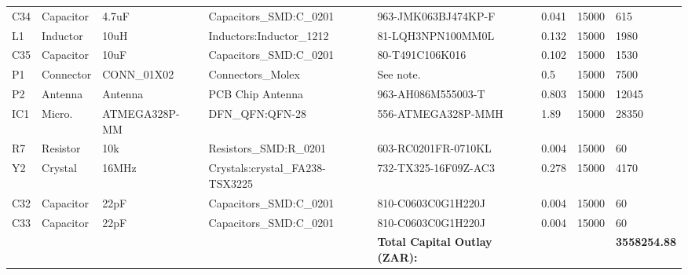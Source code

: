 \begin{landscape}
\begin{table}[]
\begin{tabular}{llllllll}
C34            & Capacitor     & 4.7uF                      & Capacitors\_SMD:C\_0201         & 963-JMK063BJ474KP-F                  & 0.041                & 15000           & 615                  \\
L1             & Inductor      & 10uH                       & Inductors:Inductor\_1212        & 81-LQH3NPN100MM0L                    & 0.132                & 15000           & 1980                 \\
C35            & Capacitor     & 10uF                       & Capacitors\_SMD:C\_0201         & 80-T491C106K016                      & 0.102                & 15000           & 1530                 \\
P1             & Connector     & CONN\_01X02                & Connectors\_Molex               & See note.                            & 0.5                  & 15000           & 7500                 \\
P2             & Antenna       & Antenna                    & PCB Chip Antenna                & 963-AH086M555003-T                   & 0.803                & 15000           & 12045                \\
IC1            & Micro.        & ATMEGA328P-MM              & DFN\_QFN:QFN-28                 & 556-ATMEGA328P-MMH                   & 1.89                 & 15000           & 28350                \\
R7             & Resistor      & 10k                        & Resistors\_SMD:R\_0201          & 603-RC0201FR-0710KL                  & 0.004                & 15000           & 60                   \\
Y2             & Crystal       & 16MHz                      & Crystals:crystal\_FA238-TSX3225 & 732-TX325-16F09Z-AC3                 & 0.278                & 15000           & 4170                 \\
C32            & Capacitor     & 22pF                       & Capacitors\_SMD:C\_0201         & 810-C0603C0G1H220J                   & 0.004                & 15000           & 60                   \\
C33            & Capacitor     & 22pF                       & Capacitors\_SMD:C\_0201         & 810-C0603C0G1H220J                   & 0.004                & 15000           & 60                   \\
               &               &                            &                                 & \textbf{Total Capital Outlay (ZAR):} &                      &                 & \textbf{3558254.88}  \\

\end{tabular}
\end{table}
\end{landscape}
